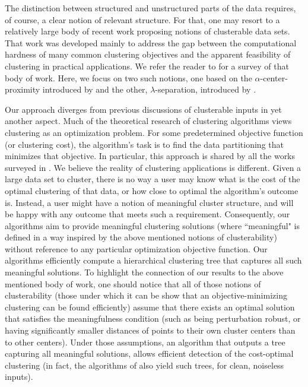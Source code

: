 \documentclass[anon,12pt]{colt2016} %
\begin{document}
The distinction between structured and unstructured parts of the data requires, of course, a clear notion of relevant structure. For that, one may resort to a relatively large body of recent work proposing notions of clusterable data sets. That work was developed mainly to address the gap between the computational hardness of many common clustering 
objectives and the apparent feasibility of clustering in practical applications. We refer the reader to \cite{ben2015computational} for a survey of that body of work.
Here, we focus on two such notions, one based on the $\alpha$-center-proximity introduced by \cite{awasthi2012center} and the other, $\lambda$-separation, introduced by \cite{ben2014clustering}.


Our approach diverges from previous discussions of clusterable inputs in yet another aspect. Much of the theoretical research of clustering algorithms views clustering as an optimization problem. For some predetermined objective function (or clustering cost), the algorithm's task is to find the data partitioning that minimizes that objective. In particular, this approach is shared by all the works surveyed in \cite{ben2015computational}. We believe the reality of clustering applications is different. Given a large data set to cluster, there is no way a user may know what is the cost of the optimal clustering of that data, or how close to optimal the algorithm's outcome is. Instead, a user might have a notion of meaningful cluster structure, and will be happy with any outcome that meets such a requirement. Consequently, our algorithms aim to provide meaningful clustering solutions (where ``meaningful" is defined in a way inspired by the above mentioned notions of clusterability) without reference to any particular optimization objective function. Our algorithms efficiently compute a hierarchical clustering tree that captures all such meaningful solutions. To highlight the connection of our results to the above mentioned body of work, one should notice that all of those notions of clusterability (those under which it can be show that an objective-minimizing clustering can be found efficiently) assume that there exists an optimal solution that satisfies the meaningfulness condition (such as being perturbation robust, or having significantly smaller distances of points to their own cluster centers than to other centers). Under those assumptions, an algorithm that outputs a tree capturing all meaningful solutions, allows efficient detection of the cost-optimal clustering (in fact, the algorithms of \cite{balcan2012clustering} also yield such trees, for clean, noiseless inputs).
\end{document}
